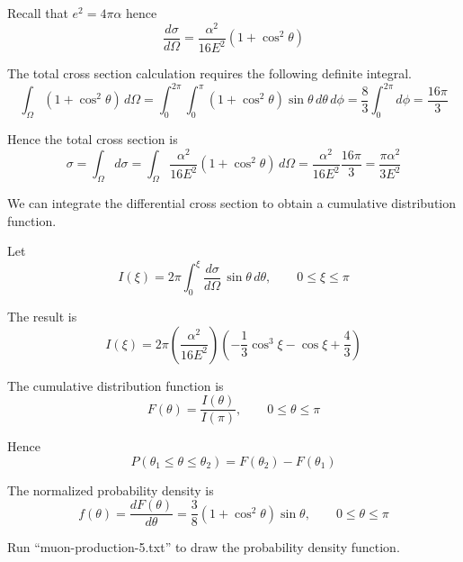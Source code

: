 \documentclass[12pt]{article}
\begin{document}
\noindent
Recall that $e^2=4\pi\alpha$ hence
\begin{equation*}
\frac{d\sigma}{d\Omega}=\frac{\alpha^2}{16E^2}(1+\cos^2\theta)
\end{equation*}

\noindent
The total cross section calculation requires the following definite integral.
$$
\int_\Omega(1+\cos^2\theta)\,d\Omega
=\int_0^{2\pi}\int_0^\pi(1+\cos^2\theta)\sin\theta\,d\theta\,d\phi
=\frac{8}{3}\int_0^{2\pi}d\phi
=\frac{16\pi}{3}
$$

\noindent
Hence the total cross section is
$$
\sigma
=\int_\Omega d\sigma
=\int_\Omega\frac{\alpha^2}{16E^2}(1+\cos^2\theta)\,d\Omega
=\frac{\alpha^2}{16E^2}\frac{16\pi}{3}
=\frac{\pi\alpha^2}{3E^2}
$$

\noindent
We can integrate the differential cross section to obtain a cumulative distribution function.

\bigskip
\noindent
Let
\begin{equation*}
I(\xi)=2\pi\int_0^\xi\frac{d\sigma}{d\Omega}\,\sin\theta\,d\theta,
\qquad0\le\xi\le\pi
\end{equation*}

\noindent
The result is
\begin{equation*}
I(\xi)=2\pi\left(\frac{\alpha^2}{16E^2}\right)
\left(-\frac{1}{3}\cos^3\xi-\cos\xi+\frac{4}{3}\right)
\end{equation*}

\noindent
The cumulative distribution function is
\begin{equation*}
F(\theta)=\frac{I(\theta)}{I(\pi)},\qquad0\le\theta\le\pi
\end{equation*}

\noindent
Hence
\begin{equation*}
P(\theta_1\le\theta\le\theta_2)=F(\theta_2)-F(\theta_1)
\end{equation*}

\noindent
The normalized probability density is
\begin{equation*}
f(\theta)=\frac{dF(\theta)}{d\theta}=\frac{3}{8}(1+\cos^2\theta)\sin\theta,
\qquad0\le\theta\le\pi
\end{equation*}

\noindent
Run ``muon-production-5.txt'' to draw the probability density function.
\end{document}
